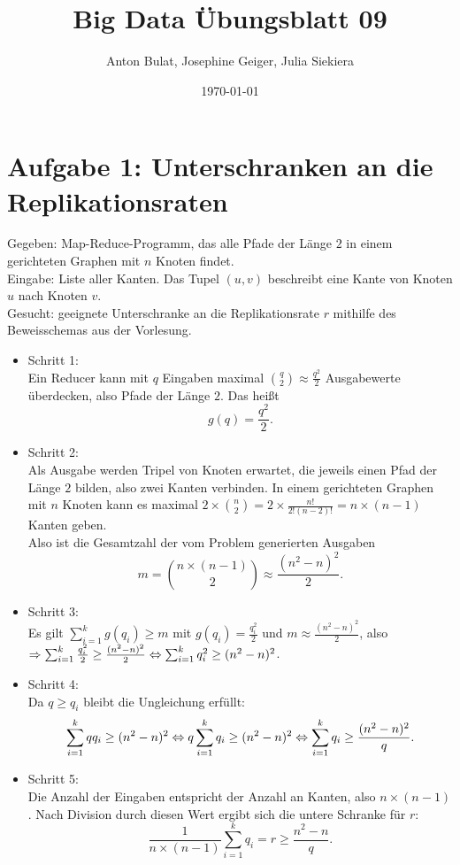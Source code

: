\documentclass{article}
\title{Big Data \"Ubungsblatt 09}
\author{Anton Bulat, Josephine Geiger, Julia Siekiera} %
\date{\today} %
\begin{document}
\maketitle %

\section*{Aufgabe 1: Unterschranken an die Replikationsraten}

Gegeben: Map-Reduce-Programm, das alle Pfade der L\"ange $2$ in einem gerichteten Graphen mit $n$ Knoten findet.\\
Eingabe: Liste aller Kanten. Das Tupel $(u,v)$ beschreibt eine Kante von Knoten $u$ nach Knoten $v$.\\
Gesucht: geeignete Unterschranke an die Replikationsrate $r$ mithilfe des Beweisschemas aus der Vorlesung.


\begin{itemize}
\item Schritt 1:\\
Ein Reducer kann mit $q$ Eingaben maximal $\binom q 2 \approx \frac{q^2}{2}$ Ausgabewerte \"uberdecken, also Pfade der L\"ange $2$. Das hei\ss t
$$g(q) = \frac{q^2}{2}.$$

\item Schritt 2:\\
Als Ausgabe werden Tripel von Knoten erwartet, die jeweils einen Pfad der L\"ange $2$ bilden, also zwei Kanten verbinden. In einem gerichteten Graphen mit $n$ Knoten kann es maximal $2\times \binom n 2 = 2\times \frac{n!}{2!(n-2)!} = n\times(n-1)$ Kanten geben.\\
Also ist die Gesamtzahl der vom Problem generierten Ausgaben $$m = \binom{n \times(n-1)} 2 \approx \frac{(n^2-n)^2}{2}.$$

\item Schritt 3:\\
Es gilt $\sum_{i=1}^k g(q_i) \geq m$ mit $g(q_i) = \frac{q_i^2}{2}$ und $m \approx \frac{(n^2-n)^2}{2}$, also\\
$\Rightarrow \sum_{i=1}^k \frac{q_i^2}{2} \geq \frac{(n^2-n)^2}{2}\\ \Leftrightarrow \sum_{i=1}^k q_i^2 \geq (n^2-n)^2$.\\
\item Schritt 4:\\
Da $q \geq q_i$ bleibt die Ungleichung erf\"ullt:
$$\sum_{i=1}^k qq_i \geq (n^2-n)^2\\
\Leftrightarrow q \sum_{i=1}^k q_i \geq (n^2-n)^2\\
\Leftrightarrow \sum_{i=1}^k q_i \geq \frac{(n^2-n)^2}{q}.$$

\item Schritt 5:\\
Die Anzahl der Eingaben entspricht der Anzahl an Kanten, also $n\times(n-1)$. Nach Division durch diesen Wert ergibt sich die untere Schranke f\"ur $r$:
$$ \frac{1}{n\times(n-1)} \sum_{i=1}^k q_i = r \geq \frac{n^2-n}{q}.$$
\end{itemize}
\end{document}
